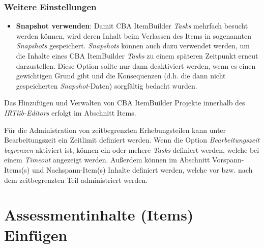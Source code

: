 \documentclass[
  letterpaper,
  DIV=11]{scrreprt}
\providecommand{\tightlist}{%
  \setlength{\itemsep}{0pt}\setlength{\parskip}{0pt}}\usepackage{longtable,booktabs,array}
\begin{document}
\begin{tcolorbox}
\hypertarget{weitere-einstellungen-5}{%
\subsubsection{Weitere Einstellungen}\label{weitere-einstellungen-5}}

\begin{itemize}
\tightlist
\item
  \textbf{Snapshot verwenden}: Damit CBA ItemBuilder \emph{Tasks}
  mehrfach besucht werden können, wird deren Inhalt beim Verlassen des
  Items in sogenannten \emph{Snapshots} gespeichert. \emph{Snapshots}
  können auch dazu verwendet werden, um die Inhalte eines CBA
  ItemBuilder \emph{Tasks} zu einem späteren Zeitpunkt erneut
  darzustellen. Diese Option sollte nur dann deaktiviert werden, wenn es
  einen gewichtigen Grund gibt und die Konsequenzen (d.h. die dann nicht
  gespeicherten \emph{Snapshot}-Daten) sorgfältig bedacht wurden.
\end{itemize}

\end{tcolorbox}

Das Hinzufügen und Verwalten von CBA ItemBuilder Projekte innerhalb des
\emph{IRTlib-Editors} erfolgt im Abschnitt Items.

\begin{tcolorbox}[enhanced jigsaw, colbacktitle=quarto-callout-caution-color!10!white, coltitle=black, colframe=quarto-callout-caution-color-frame, leftrule=.75mm, breakable, opacitybacktitle=0.6, toprule=.15mm, title=\textcolor{quarto-callout-caution-color}{\faFire}\hspace{0.5em}{Hinweis zur Zeitbegrenzung}, colback=white, titlerule=0mm, arc=.35mm, bottomtitle=1mm, toptitle=1mm, rightrule=.15mm, bottomrule=.15mm, left=2mm, opacityback=0]

Für die Administration von zeitbegrenzten Erhebungsteilen kann unter
Bearbeitungszeit ein Zeitlimit definiert werden. Wenn die Option
\emph{Bearbeitungszeit begrenzen} aktiviert ist, können ein oder mehere
\emph{Tasks} definiert werden, welche bei einem \emph{Timeout} angezeigt
werden. Außerdem können im Abschnitt Vorspann-Items(s) und
Nachspann-Item(s) Inhalte definiert werden, welche vor bzw. nach dem
zeitbegrenzten Teil administriert werden.

\end{tcolorbox}

\hypertarget{assessmentinhalte-items-einfuxfcgen-1}{%
\section{Assessmentinhalte (Items)
Einfügen}\label{assessmentinhalte-items-einfuxfcgen-1}}
\end{document}
